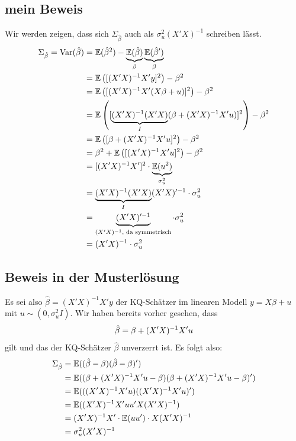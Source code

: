 \documentclass{article}
\newcommand{\E}{\mathbb{E}}
\DeclareMathOperator{\Var}{Var}
\begin{document}
	\subsection{mein Beweis}
	Wir werden zeigen, dass sich $\Sigma_{\hat{\beta}}$ auch als $\sigma^2_u(X'X)^{-1}$ schreiben lässt.
	\begin{align}
		\Sigma_{\hat{\beta}} = \Var(\hat{\beta}) &= \E(\hat{\beta}^2) - \underbrace{\E(\hat{\beta})}_{\beta}\underbrace{\E(\hat{\beta}')}_{\beta} \notag \\
		&= \E\left([(X'X)^{-1}X'y]^2\right) - \beta^2 \notag \\
		&= \E\left( [(X'X)^{-1}X'(X\beta+u)]^2\right) - \beta^2 \notag \\
		&= \E\left([\underbrace{(X'X)^{-1}(X'X)}_{I}(\beta + (X'X)^{-1}X'u)]^2\right) - \beta^2 \notag \\
		&= \E \left( [\beta + (X'X)^{-1}X'u]^2\right) - \beta^2 \notag \\
		&= \beta^2 + \E\left([(X'X)^{-1}X'u]^2 \right) - \beta^2 \notag \\
		&= [(X'X)^{-1}X']^2\cdot \underbrace{\E(u^2)}_{\sigma_u^2} \notag \\
		&= \underbrace{(X'X)^{-1}(X'X)}_{I}(X'X)'^{-1} \cdot\sigma_u^2 \notag \\
		&= \underbrace{(X'X)'^{-1}}_{(X'X)^{-1}\text{, da symmetrisch}}\cdot\sigma_u^2 \notag \\
		&= (X'X)^{-1}\cdot\sigma_u^2 \notag
	\end{align}

	\subsection{Beweis in der Musterlösung}
	Es sei also $\hat{\beta}=(X'X)^{-1}X'y$ der KQ-Schätzer im linearen Modell $y=X\beta + u$ mit $u\sim (0,\sigma^2_uI)$. Wir haben bereits vorher gesehen, dass
	\begin{align}
		\hat{\beta} = \beta + (X'X)^{-1}X'u \notag
	\end{align}
	gilt und das der KQ-Schätzer $\hat{\beta}$ unverzerrt ist. Es folgt also:
	\begin{align}
		\Sigma_{\hat{\beta}} &= \E((\hat{\beta}-\beta)(\hat{\beta}-\beta)') \notag \\
		&= \E((\beta + (X'X)^{-1}X'u - \beta)(\beta + (X'X)^{-1}X'u - \beta)') \notag \\
		&= \E(((X'X)^{-1}X'u)((X'X)^{-1}X'u)') \notag \\
		&= \E((X'X)^{-1}X'uu'X(X'X)^{-1}) \notag \\
		&= (X'X)^{-1}X'\cdot\E(uu')\cdot X(X'X)^{-1} \notag \\
		&= \sigma_u^2(X'X)^{-1} \notag
	\end{align}
	
\end{document}
